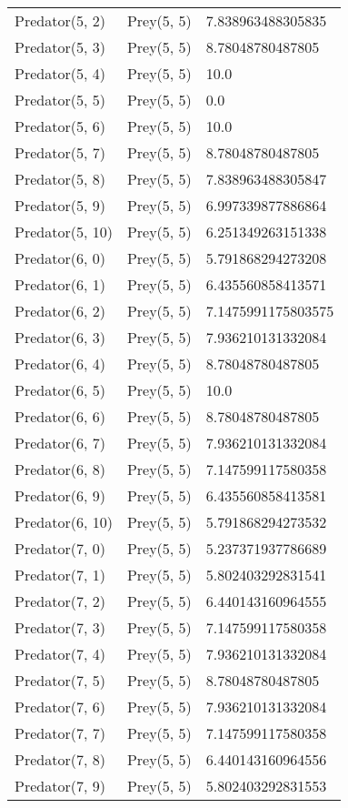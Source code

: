 \begin{longtable}{| p{} | p{} | p{} |}
Predator(5, 2) & Prey(5, 5) &7.838963488305835\\
Predator(5, 3) & Prey(5, 5) &8.78048780487805\\
Predator(5, 4) & Prey(5, 5) &10.0\\
Predator(5, 5) & Prey(5, 5) &0.0\\
Predator(5, 6) & Prey(5, 5) &10.0\\
Predator(5, 7) & Prey(5, 5) &8.78048780487805\\
Predator(5, 8) & Prey(5, 5) &7.838963488305847\\
Predator(5, 9) & Prey(5, 5) &6.997339877886864\\
Predator(5, 10) & Prey(5, 5) &6.251349263151338\\
Predator(6, 0) & Prey(5, 5) &5.791868294273208\\
Predator(6, 1) & Prey(5, 5) &6.435560858413571\\
Predator(6, 2) & Prey(5, 5) &7.1475991175803575\\
Predator(6, 3) & Prey(5, 5) &7.936210131332084\\
Predator(6, 4) & Prey(5, 5) &8.78048780487805\\
Predator(6, 5) & Prey(5, 5) &10.0\\
Predator(6, 6) & Prey(5, 5) &8.78048780487805\\
Predator(6, 7) & Prey(5, 5) &7.936210131332084\\
Predator(6, 8) & Prey(5, 5) &7.147599117580358\\
Predator(6, 9) & Prey(5, 5) &6.435560858413581\\
Predator(6, 10) & Prey(5, 5) &5.791868294273532\\
Predator(7, 0) & Prey(5, 5) &5.237371937786689\\
Predator(7, 1) & Prey(5, 5) &5.802403292831541\\
Predator(7, 2) & Prey(5, 5) &6.440143160964555\\
Predator(7, 3) & Prey(5, 5) &7.147599117580358\\
Predator(7, 4) & Prey(5, 5) &7.936210131332084\\
Predator(7, 5) & Prey(5, 5) &8.78048780487805\\
Predator(7, 6) & Prey(5, 5) &7.936210131332084\\
Predator(7, 7) & Prey(5, 5) &7.147599117580358\\
Predator(7, 8) & Prey(5, 5) &6.440143160964556\\
Predator(7, 9) & Prey(5, 5) &5.802403292831553\\

\end{longtable}
